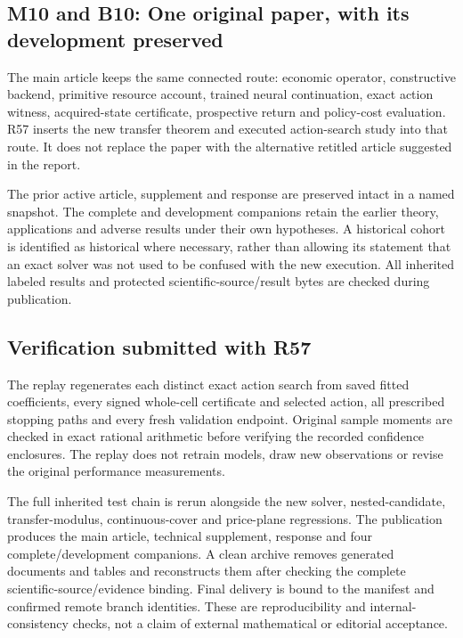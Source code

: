 \hypertarget{m10-and-b10-one-original-paper-with-its-development-preserved}{%
\subsection{M10 and B10: One original paper, with its development
preserved}\label{m10-and-b10-one-original-paper-with-its-development-preserved}}

The main article keeps the same connected route: economic operator,
constructive backend, primitive resource account, trained neural
continuation, exact action witness, acquired-state certificate,
prospective return and policy-cost evaluation. R57 inserts the new
transfer theorem and executed action-search study into that route. It
does not replace the paper with the alternative retitled article
suggested in the report.

The prior active article, supplement and response are preserved intact
in a named snapshot. The complete and development companions retain the
earlier theory, applications and adverse results under their own
hypotheses. A historical cohort is identified as historical where
necessary, rather than allowing its statement that an exact solver was
not used to be confused with the new execution. All inherited labeled
results and protected scientific-source/result bytes are checked during
publication.

\hypertarget{verification-submitted-with-r57}{%
\subsection{Verification submitted with
R57}\label{verification-submitted-with-r57}}

The replay regenerates each distinct exact action search from saved
fitted coefficients, every signed whole-cell certificate and selected
action, all prescribed stopping paths and every fresh validation
endpoint. Original sample moments are checked in exact rational
arithmetic before verifying the recorded confidence enclosures. The
replay does not retrain models, draw new observations or revise the
original performance measurements.

The full inherited test chain is rerun alongside the new solver,
nested-candidate, transfer-modulus, continuous-cover and price-plane
regressions. The publication produces the main article, technical
supplement, response and four complete/development companions. A clean
archive removes generated documents and tables and reconstructs them
after checking the complete scientific-source/evidence binding. Final
delivery is bound to the manifest and confirmed remote branch
identities. These are reproducibility and internal-consistency checks,
not a claim of external mathematical or editorial acceptance.
